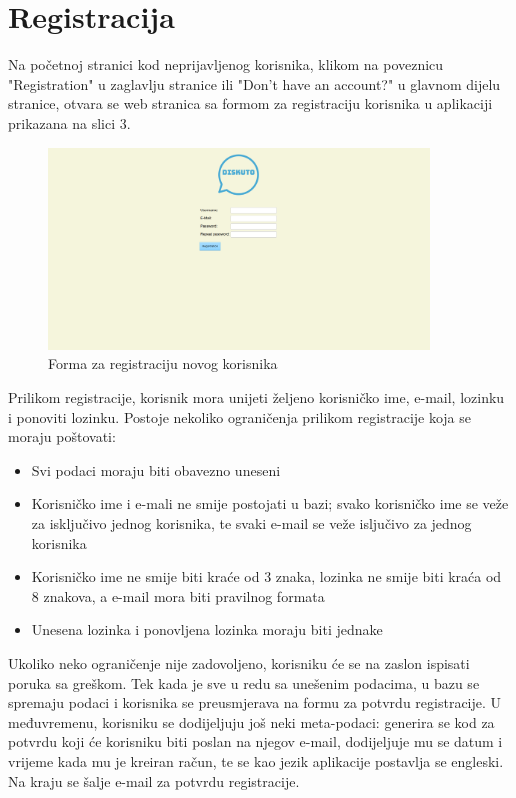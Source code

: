 \documentclass{foi}
\begin{document}
\section{Registracija}

Na početnoj stranici kod neprijavljenog korisnika, klikom na poveznicu "Registration" u zaglavlju stranice ili "Don't have an account?" u glavnom dijelu stranice, otvara se web stranica sa formom za registraciju korisnika u aplikaciji prikazana na slici 3.

\begin{figure}[h!]
    \centering
    \includegraphics[width=0.9\textwidth]{slike/registracija.png}
    \caption{Forma za registraciju novog korisnika}
\end{figure}

Prilikom registracije, korisnik mora unijeti željeno korisničko ime, e-mail, lozinku i ponoviti lozinku. Postoje nekoliko ograničenja prilikom registracije koja se moraju poštovati:

\begin{itemize}
\item Svi podaci moraju biti obavezno uneseni
\item Korisničko ime i e-mali ne smije postojati u bazi; svako korisničko ime se veže za isključivo jednog korisnika, te svaki e-mail se veže isljučivo za jednog korisnika
\item Korisničko ime ne smije biti kraće od 3 znaka, lozinka ne smije biti kraća od 8 znakova, a e-mail mora biti pravilnog formata
\item Unesena lozinka i ponovljena lozinka moraju biti jednake
\end{itemize}

Ukoliko neko ograničenje nije zadovoljeno, korisniku će se na zaslon ispisati poruka sa greškom. Tek kada je sve u redu sa unešenim podacima, u bazu se spremaju podaci i korisnika se preusmjerava na formu za potvrdu registracije. U međuvremenu, korisniku se dodijeljuju još neki meta-podaci: generira se kod za potvrdu koji će korisniku biti poslan na njegov e-mail, dodijeljuje mu se datum i vrijeme kada mu je kreiran račun, te se kao jezik aplikacije postavlja se engleski. Na kraju se šalje e-mail za potvrdu registracije.
\end{document}
